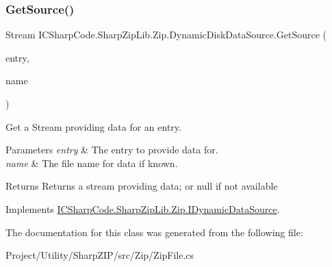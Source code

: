 \subsubsection{\texorpdfstring{Get\+Source()}{GetSource()}}
{\footnotesize\ttfamily Stream I\+C\+Sharp\+Code.\+Sharp\+Zip\+Lib.\+Zip.\+Dynamic\+Disk\+Data\+Source.\+Get\+Source (\begin{DoxyParamCaption}\item[{\hyperlink{class_i_c_sharp_code_1_1_sharp_zip_lib_1_1_zip_1_1_zip_entry}{Zip\+Entry}}]{entry,  }\item[{string}]{name }\end{DoxyParamCaption})\hspace{0.3cm}{\ttfamily [inline]}}



Get a Stream providing data for an entry. 


\begin{DoxyParams}{Parameters}
{\em entry} & The entry to provide data for.\\
\hline
{\em name} & The file name for data if known.\\
\hline
\end{DoxyParams}
\begin{DoxyReturn}{Returns}
Returns a stream providing data; or null if not available
\end{DoxyReturn}


Implements \hyperlink{interface_i_c_sharp_code_1_1_sharp_zip_lib_1_1_zip_1_1_i_dynamic_data_source_a33808af75b8f68dc18b7fcd55a5f951f}{I\+C\+Sharp\+Code.\+Sharp\+Zip\+Lib.\+Zip.\+I\+Dynamic\+Data\+Source}.



The documentation for this class was generated from the following file\+:\begin{DoxyCompactItemize}
\item 
Project/\+Utility/\+Sharp\+Z\+I\+P/src/\+Zip/Zip\+File.\+cs\end{DoxyCompactItemize}
